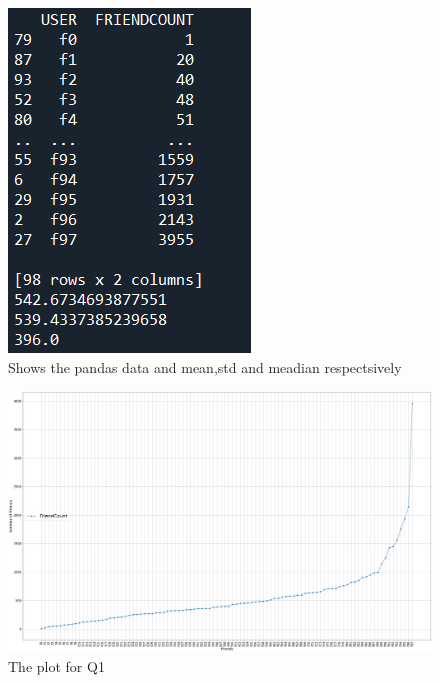\documentclass[12pt]{article}
\begin{document}
\begin{figure}[H]
    \centering
    \includegraphics[trim=0 0 0 0, clip, width=\textwidth] {console_output1.PNG}
    \caption{Shows the pandas data and mean,std and meadian respectsively}
    \label{fig:Running output}
\end{figure}

\begin{figure}[H]
    \centering
    \includegraphics[trim=0 0 0 0, clip, width=\textwidth] {finalPotQ1.PNG}
    \caption{The plot for Q1 }
    \label{fig:q1}
\end{figure}
\end{document}
